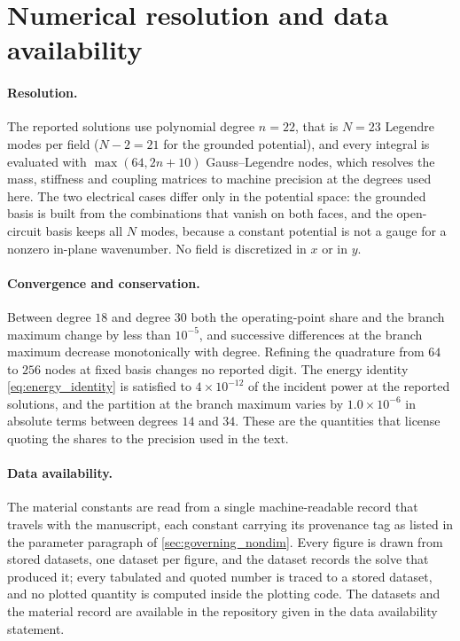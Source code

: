 \section{Numerical resolution and data availability}
\label{app:repro}

\paragraph{Resolution.}  The reported solutions use polynomial degree $n=22$, that is
$N=23$ Legendre modes per field ($N-2=21$ for the grounded potential), and every integral is evaluated
with $\max(64,2n+10)$ Gauss--Legendre nodes, which resolves the mass, stiffness
and coupling matrices to machine precision at the degrees used here.  The two
electrical cases differ only in the potential space: the grounded basis is built
from the combinations that vanish on both faces, and the open-circuit basis
keeps all $N$ modes, because a constant potential is not a gauge for a nonzero in-plane wavenumber.  No field is discretized in $x$ or in $y$.

\paragraph{Convergence and conservation.}  Between degree $18$ and degree $30$
both the operating-point share and the branch maximum change by less than
$10^{-5}$, and successive differences at the branch maximum decrease
monotonically with degree.  Refining the quadrature from $64$ to $256$ nodes at
fixed basis changes no reported digit.  The energy identity
\eqref{eq:energy_identity} is satisfied to $4\times10^{-12}$ of the incident
power at the reported solutions, and the partition at the branch maximum varies by $1.0\times10^{-6}$ in absolute terms between
degrees $14$ and $34$.  These are the quantities that
license quoting the shares to the precision used in the text.

\paragraph{Data availability.}  The material constants are read from a single
machine-readable record that travels with the manuscript, each constant carrying
its provenance tag as listed in the parameter paragraph of \cref{sec:governing_nondim}.  Every figure is drawn
from stored datasets, one dataset per figure, and the dataset records the solve
that produced it; every tabulated and quoted number is traced to a stored dataset, and no plotted
quantity is computed inside the plotting code.  The datasets and the material
record are available in the repository given in the data availability statement.

